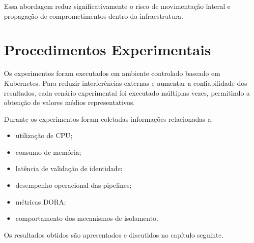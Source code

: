 Essa abordagem reduz significativamente o risco de movimentação lateral e propagação de comprometimentos dentro da infraestrutura.

\section{Procedimentos Experimentais}

Os experimentos foram executados em ambiente controlado baseado em Kubernetes. Para reduzir interferências externas e aumentar a confiabilidade dos resultados, cada cenário experimental foi executado múltiplas vezes, permitindo a obtenção de valores médios representativos.

Durante os experimentos foram coletadas informações relacionadas a:

\begin{itemize}
    \item utilização de CPU;
    \item consumo de memória;
    \item latência de validação de identidade;
    \item desempenho operacional das pipelines;
    \item métricas DORA;
    \item comportamento dos mecanismos de isolamento.
\end{itemize}

Os resultados obtidos são apresentados e discutidos no capítulo seguinte.
